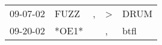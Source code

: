 \begin{supertabular}{lllll}
 09-07-02 &   FUZZ &  , &  \textgreater &  DRUM \\
 09-20-02 &  *OE1* &    &             , &  btfl \\
\end{supertabular}
